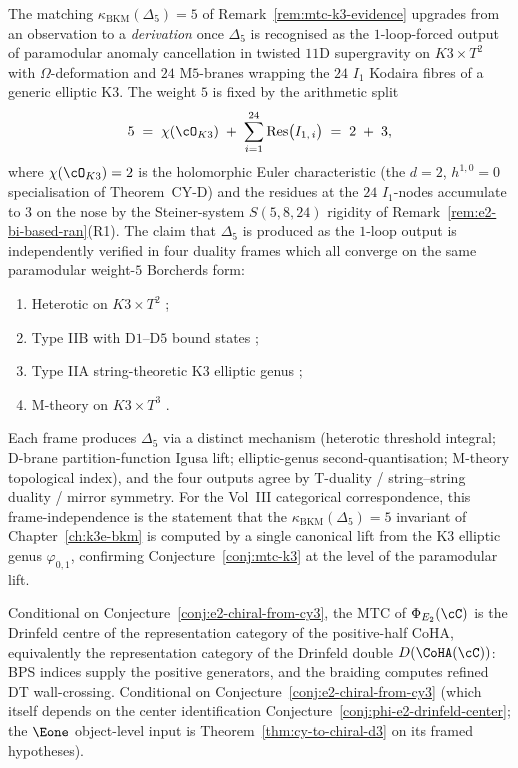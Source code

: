 \begin{remark}
\label{rem:e2-delta5-one-loop-four-frames}
The matching $\kappa_{\mathrm{BKM}}(\Delta_5) = 5$ of
Remark~\ref{rem:mtc-k3-evidence} upgrades from an observation to a
\emph{derivation} once $\Delta_5$ is recognised as the $1$-loop-forced
output of paramodular anomaly cancellation in twisted $11$D supergravity
on $K3 \times T^2$ with $\Omega$-deformation and $24$ M$5$-branes wrapping
the $24$ $I_1$ Kodaira fibres of a generic elliptic K3. The weight
$5$ is fixed by the arithmetic split
\[
 5 \;=\; \chi(\cO_{K3}) \;+\; \sum_{i=1}^{24}
 \mathrm{Res}\bigl(I_{1,\,i}\bigr)
 \;=\; 2 \;+\; 3,
\]
where $\chi(\cO_{K3}) = 2$ is the holomorphic Euler characteristic (the
$d = 2$, $h^{1,0} = 0$ specialisation of Theorem~CY-D) and the
residues at the $24$ $I_1$-nodes accumulate to $3$ on the nose by the
Steiner-system $S(5,8,24)$ rigidity of
Remark~\ref{rem:e2-bi-based-ran}(R1). The claim that
$\Delta_5$ is produced as the $1$-loop output is independently verified in
four duality frames which all converge on the same paramodular weight-$5$
Borcherds form:
\begin{enumerate}[label=\textup{(D\arabic*)}]
 \item Heterotic on $K3 \times T^2$ \cite{HarveyMoore1996};
 \item Type IIB with D$1$--D$5$ bound states \cite{DijkgraafVerlindeVerlinde1996};
 \item Type IIA string-theoretic K3 elliptic genus
 \cite{DijkgraafMooreVerlindeVerlinde1997};
 \item M-theory on $K3 \times T^3$ \cite{Witten1995}.
\end{enumerate}
Each frame produces $\Delta_5$ via a distinct mechanism (heterotic
threshold integral; D-brane partition-function Igusa lift; elliptic-genus
second-quantisation; M-theory topological index), and the four outputs
agree by T-duality / string--string duality / mirror symmetry. For the
Vol~III categorical correspondence, this frame-independence is the statement
that the $\kappa_{\mathrm{BKM}}(\Delta_5) = 5$ invariant of
Chapter~\ref{ch:k3e-bkm} is computed by a single canonical lift from the
K3 elliptic genus $\varphi_{0,1}$, confirming
Conjecture~\ref{conj:mtc-k3} at the level of the paramodular lift.
\end{remark}

\begin{conjecture}
\label{conj:mtc-cy3-coha}
\ClaimStatusConjectured
Conditional on Conjecture~\ref{conj:e2-chiral-from-cy3}, the MTC of
$\Phi_{E_2}(\cC)$ is the Drinfeld centre of the representation category
of the positive-half CoHA, equivalently the representation category of
the Drinfeld double $D(\CoHA(\cC))$: BPS indices supply the positive
 generators, and the braiding computes refined DT wall-crossing. Conditional on
Conjecture~\ref{conj:e2-chiral-from-cy3} (which itself depends on
the center identification
Conjecture~\ref{conj:phi-e2-drinfeld-center}; the $\Eone$ object-level
input is Theorem~\ref{thm:cy-to-chiral-d3} on its framed hypotheses).
\end{conjecture}

